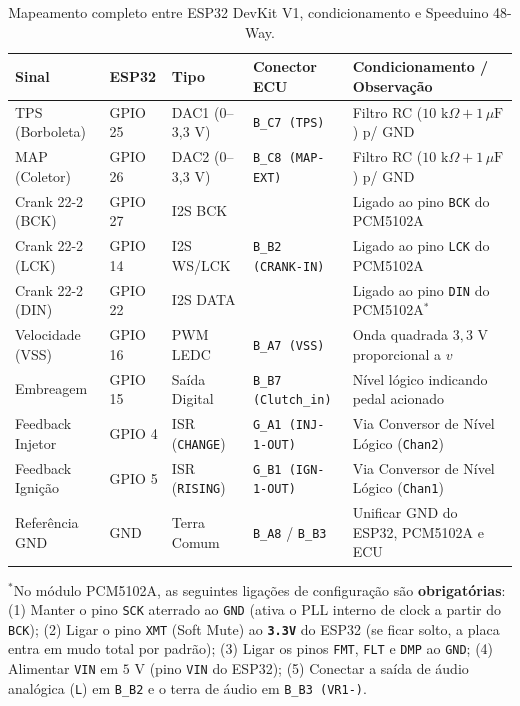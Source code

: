 \documentclass[12pt,a4paper]{article}
\begin{document}
\begin{table}[H]
\centering
\caption{Mapeamento completo entre ESP32 DevKit V1, condicionamento e Speeduino 48-Way.}
\label{tab:pinout}
\footnotesize
\begin{tabularx}{\textwidth}{@{}llllX@{}}
\toprule
\textbf{Sinal} & \textbf{ESP32} & \textbf{Tipo} & \textbf{Conector ECU} & \textbf{Condicionamento / Observação} \\
\midrule
TPS (Borboleta) & GPIO 25 & DAC1 (0--3,3 V) & \texttt{B\_C7 (TPS)} & Filtro RC ($10\text{ k}\Omega + 1\,\mu\text{F}$) p/ GND \\
MAP (Coletor) & GPIO 26 & DAC2 (0--3,3 V) & \texttt{B\_C8 (MAP-EXT)} & Filtro RC ($10\text{ k}\Omega + 1\,\mu\text{F}$) p/ GND \\
Crank 22-2 (BCK) & GPIO 27 & I2S BCK & \multirow{3}{*}{\texttt{B\_B2 (CRANK-IN)}} & Ligado ao pino \texttt{BCK} do PCM5102A \\
Crank 22-2 (LCK) & GPIO 14 & I2S WS/LCK & & Ligado ao pino \texttt{LCK} do PCM5102A \\
Crank 22-2 (DIN) & GPIO 22 & I2S DATA & & Ligado ao pino \texttt{DIN} do PCM5102A$^{*}$ \\
Velocidade (VSS) & GPIO 16 & PWM LEDC & \texttt{B\_A7 (VSS)} & Onda quadrada $3{,}3\text{ V}$ proporcional a $v$ \\
Embreagem & GPIO 15 & Saída Digital & \texttt{B\_B7 (Clutch\_in)} & Nível lógico indicando pedal acionado \\
Feedback Injetor & GPIO 4 & ISR (\texttt{CHANGE}) & \texttt{G\_A1 (INJ-1-OUT)} & Via Conversor de Nível Lógico (\texttt{Chan2}) \\
Feedback Ignição & GPIO 5 & ISR (\texttt{RISING}) & \texttt{G\_B1 (IGN-1-OUT)} & Via Conversor de Nível Lógico (\texttt{Chan1}) \\
Referência GND & GND & Terra Comum & \texttt{B\_A8} / \texttt{B\_B3} & Unificar GND do ESP32, PCM5102A e ECU \\
\bottomrule
\end{tabularx}
\vspace{2pt}
\raggedright{\scriptsize $^{*}$No módulo PCM5102A, as seguintes ligações de configuração são \textbf{obrigatórias}:
(1) Manter o pino \texttt{SCK} aterrado ao \texttt{GND} (ativa o PLL interno de clock a partir do \texttt{BCK});
(2) Ligar o pino \texttt{XMT} (Soft Mute) ao \textbf{\texttt{3.3V}} do ESP32 (se ficar solto, a placa entra em mudo total por padrão);
(3) Ligar os pinos \texttt{FMT}, \texttt{FLT} e \texttt{DMP} ao \texttt{GND};
(4) Alimentar \texttt{VIN} em $5\text{ V}$ (pino \texttt{VIN} do ESP32);
(5) Conectar a saída de áudio analógica (\texttt{L}) em \texttt{B\_B2} e o terra de áudio em \texttt{B\_B3 (VR1-)}.}
\end{table}
\end{document}
